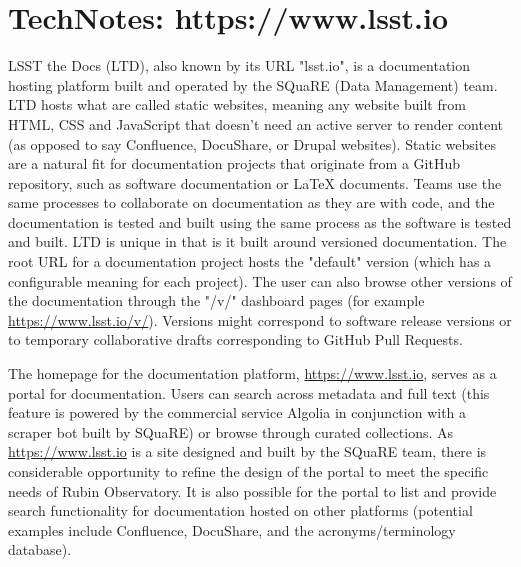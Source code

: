 \newpage
\section{TechNotes: https://www.lsst.io}

LSST the Docs (LTD), also known by its URL "lsst.io", is a documentation hosting platform built and operated by the SQuaRE (Data Management) team. LTD hosts what are called static websites, meaning any website built from HTML, CSS and JavaScript that doesn't need an active server to render content (as opposed to say Confluence, DocuShare, or Drupal websites). Static websites are a natural fit for documentation projects that originate from a GitHub repository, such as software documentation or LaTeX documents. Teams use the same processes to collaborate on documentation as they are with code, and the documentation is tested and built using the same process as the software is tested and built. LTD is unique in that is it built around versioned documentation. The root URL for a documentation project hosts the "default" version (which has a configurable meaning for each project). The user can also browse other versions of the documentation through the "/v/" dashboard pages (for example \url{https://www.lsst.io/v/}). Versions might correspond to software release versions or to temporary collaborative drafts corresponding to GitHub Pull Requests.

The homepage for the documentation platform, \url{https://www.lsst.io}, serves as a portal for documentation. \citep{lsst.io-cite} Users can search across metadata and full text (this feature is powered by the commercial service Algolia \citep{Algolia-cite} in conjunction with a scraper bot built by SQuaRE) or browse through curated collections. As \url{https://www.lsst.io} is a site designed and built by the SQuaRE team, there is considerable opportunity to refine the design of the portal to meet the specific needs of Rubin Observatory. It is also possible for the portal to list and provide search functionality for documentation hosted on other platforms (potential examples include Confluence, DocuShare, and the acronyms/terminology database).

